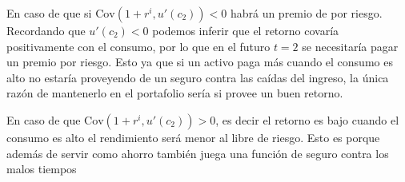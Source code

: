 En caso de que si $\text{Cov}(1+r^i,u'(c_2))<0$ habrá un premio de por riesgo. Recordando que $u'(c_2)<0$ podemos inferir que el retorno covaría positivamente con el consumo, por lo que en el futuro $t=2$ se necesitaría pagar un premio por riesgo. Esto ya que si un activo paga más cuando el consumo es alto no estaría proveyendo de un seguro contra las caídas del ingreso, la única razón de mantenerlo en el portafolio sería si provee un buen retorno. 

En caso de que $\text{Cov}(1+r^i,u'(c_2))>0$, es decir el retorno es bajo cuando el consumo es alto el rendimiento será menor al libre de riesgo. Esto es porque además de servir como ahorro también juega una función de seguro contra los malos tiempos

